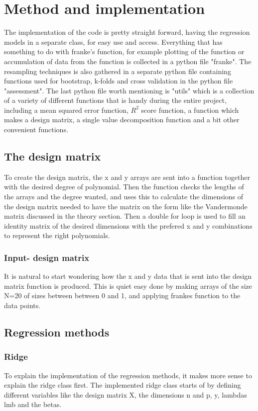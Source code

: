 \documentclass[../main.tex]{subfiles}
\begin{document}
\section{Method and implementation}\label{sec:method}
The implementation of the code is pretty straight forward, having the regression models in a separate class, for easy use and access. Everything that has something to do with franke's function, for example plotting of the function or accumulation of data from the function is collected in a python file "franke". The resampling techniques is also gathered in a separate python file containing functions used for bootstrap, k-folds and cross validation in the python file "assessment". The last python file worth mentioning is "utils" which is a collection of a variety of different functions that is handy during the entire project, including a mean squared error function, $R^2$ score function, a function which makes a design matrix, a single value decomposition function and a bit other convenient functions.

\subsection{The design matrix}
To create the design matrix, the x and y arrays are sent into a function together with the desired degree of polynomial. Then the function checks the lengths of the arrays and the degree wanted, and uses this to calculate the dimensions of the design matrix needed to have the matrix on the form like the Vandermonde matrix discussed in the theory section. Then a double for loop is used to fill an identity matrix of the desired dimensions with the prefered x and y combinations to represent the right polynomials.

\subsubsection{Input- design matrix}
It is natural to start wondering how the x and y data that is sent into the design matrix function is produced. This is quiet easy done by making arrays of the size N=20 of sizes between between 0 and 1, and applying frankes function to the data points.

\subsection{Regression methods}
\subsubsection{Ridge}
To explain the implementation of the regression methods, it makes more sense to explain the ridge class first. The implemented ridge class starts of by defining different variables like the design matrix X, the dimensions n and p, y, lambdas lmb and the betas.
\end{document}
